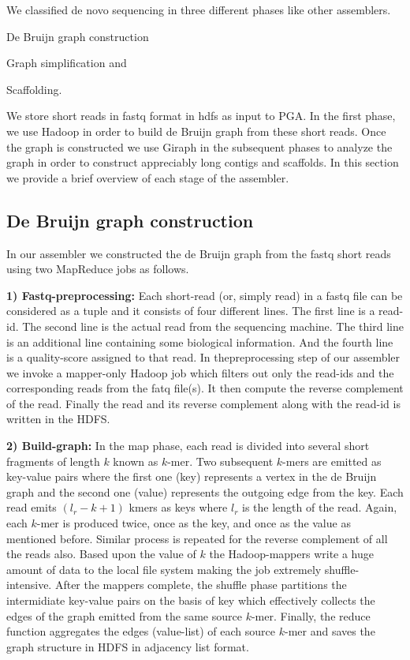 \documentclass[conference]{IEEEtran}
\begin{document}
We classified de novo sequencing in three different phases like other assemblers.
\begin{inparaenum}
\item De Bruijn graph construction
\item Graph simplification and
\item Scaffolding.
\end{inparaenum}
We store short reads in fastq format in hdfs as input to PGA.
In the first phase, we use Hadoop in order to build de Bruijn graph from these short reads. 
Once the graph is constructed we use Giraph in the subsequent phases to analyze the graph in order to construct appreciably long contigs and scaffolds.
In this section we provide a brief overview of each stage of the assembler.

\subsection {De Bruijn graph construction}
In our assembler we constructed the de Bruijn graph from the fastq short reads using two MapReduce jobs as follows. 

\textbf{1) Fastq-preprocessing:} Each short-read (or, simply read) in a fastq file can be considered as a tuple and it consists of four different lines. The first line is a read-id. The second line is the actual read from the sequencing machine. The third line is an additional line containing some biological information. And the fourth line is a quality-score assigned to that read. 
In thepreprocessing step of our assembler we invoke a mapper-only Hadoop job which filters out only the read-ids and the corresponding reads from the fatq file(s). It then compute the reverse complement of the read. Finally the read and its reverse complement along with the read-id is written in the HDFS.

\textbf{2) Build-graph:} 
In the map phase, each read is divided into several short fragments of length $k$ known as $k$-mer.
Two subsequent $k$-mers are emitted as key-value pairs where the first one (key) represents a vertex in the de Bruijn graph and the second one (value) represents the outgoing edge from the key. 
Each read emits $(l_r-k+1)$ kmers as keys where $l_r$ is the length of the read.
Again, each $k$-mer is produced twice, once as the key, and once as the value as mentioned before.
Similar process is repeated for the reverse complement of all the reads also.
Based upon the value of $k$ the Hadoop-mappers write a huge amount of data to the local file system making the job extremely shuffle-intensive. 
After the mappers complete, the shuffle phase partitions the intermidiate key-value pairs on the basis of key which effectively collects the edges of the graph emitted from the same source $k$-mer.
Finally, the reduce function aggregates the edges (value-list) of each source $k$-mer and saves the graph structure in HDFS in adjacency list format.
\end{document}
